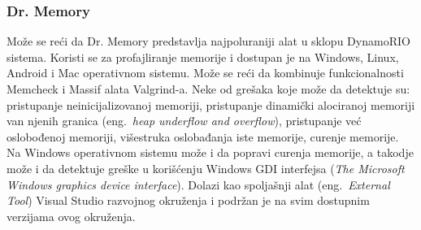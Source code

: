 \documentclass[a4paper]{article}
\begin{document}
\subsubsection{Dr. Memory}
Može se reći da Dr. Memory predstavlja najpoluraniji alat u sklopu DynamoRIO sistema. Koristi se za profajliranje memorije i dostupan je na Windows, Linux, Android i Mac operativnom sistemu. Može se reći da kombinuje funkcionalnosti Memcheck i Massif alata Valgrind-a. Neke od grešaka koje može da detektuje su: pristupanje neinicijalizovanoj memoriji, pristupanje dinamički alociranoj memoriji van njenih granica (eng.~{\em heap underflow and overflow}), pristupanje već oslobođenoj memoriji, višestruka oslobađanja iste memorije, curenje memorije. Na Windows operativnom sistemu može i da popravi curenja memorije, a takodje može i da detektuje greške u korišćenju Windows GDI interfejsa ({\em The Microsoft Windows graphics device interface}). Dolazi kao spoljašnji alat (eng.~{\em External Tool}) Visual Studio razvojnog okruženja i podržan je na svim dostupnim verzijama ovog okruženja.\cite{drmemory-doc}
\end{document}
